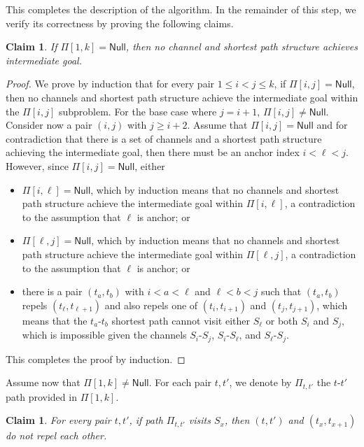 \documentclass[11pt]{article}
\newtheorem{claim}[theorem]{Claim}
\begin{document}
This completes the description of the algorithm. 
In the remainder of this step, we verify its correctness by proving the following claims.

\begin{claim}
If $\Pi[1,k]=\textsf{Null}$, then no channel and shortest path structure achieves intermediate goal.
\end{claim}

\begin{proof}
We prove by induction that for every pair $1 \le i < j \le k$, if $\Pi[i,j]=\textsf{Null}$, then no channels and shortest path structure achieve the intermediate goal within the $\Pi[i,j]$ subproblem.
For the base case where $j = i+1$, $\Pi[i,j]\ne \textsf{Null}$. Consider now a pair $(i,j)$ with $j\ge i+2$. Assume that $\Pi[i,j]=\textsf{Null}$ and for contradiction that there is a set of channels and a shortest path structure achieving the intermediate goal, then there must be an anchor index $i<\ell<j$.
However, since $\Pi[i,j]=\textsf{Null}$, either
\begin{itemize}
    \item $\Pi[i,\ell]=\textsf{Null}$, which by induction means that no channels and shortest path structure achieve the intermediate goal within $\Pi[i,\ell]$, a contradiction to the assumption that $\ell$ is anchor; or
    \item $\Pi[\ell,j]=\textsf{Null}$, which by induction means that no channels and shortest path structure achieve the intermediate goal within $\Pi[\ell,j]$, a contradiction to the assumption that $\ell$ is anchor; or
    \item there is a pair $(t_a,t_b)$ with $i<a<\ell$ and $\ell<b<j$ such that $(t_a,t_b)$ repels $(t_{\ell},t_{\ell+1})$ and also repels one of $(t_i,t_{i+1})$ and $(t_j,t_{j+1})$, which means that the $t_a$-$t_b$ shortest path cannot visit either $S_{\ell}$ or both $S_i$ and $S_j$, which is impossible given the channels $S_i$-$S_j$, $S_i$-$S_{\ell}$, and $S_{\ell}$-$S_j$.
\end{itemize}
This completes the proof by induction.
\end{proof}

Assume now that $\Pi[1,k]\ne \textsf{Null}$. For each pair $t,t'$, we denote by $\Pi_{t,t'}$ the $t$-$t'$ path provided in $\Pi[1,k]$.

\begin{claim} \label{clm:path-repel}
For every pair $t,t'$, if path $\Pi_{t,t'}$ visits $S_{x}$, then $(t, t')$ and $(t_x, t_{x+1})$ do not repel each other.
\end{claim}
\end{document}
